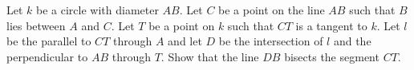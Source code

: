 Let $k$ be a circle with diameter $AB$. Let $C$ be a point on the line $AB$ such
that $B$ lies between $A$ and $C$. Let $T$ be a point on $k$ such that $CT$ is a tangent to $k$.
Let $l$ be the parallel to $CT$ through $A$ and let $D$ be the intersection of $l$ and
the perpendicular to $AB$ through $T$. Show that the line $DB$ bisects the segment $CT$.

